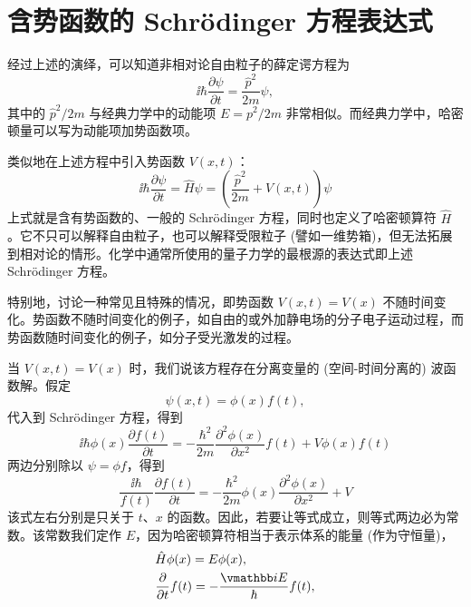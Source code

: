 \section{含势函数的 Schr\"odinger 方程表达式}%

经过上述的演绎，可以知道非相对论自由粒子的薛定谔方程为
\begin{equation}
\ii \hbar \frac{\partial \psi}{\partial t} = \frac{\hat p^2}{2 m} \psi,
\end{equation}
其中的 $\hat p^2 / 2m$ 与经典力学中的动能项 $E = p^2 / 2m$ 非常相似。而经典力学中，哈密顿量可以写为动能项加势函数项。

类似地在上述方程中引入势函数 $V(x, t)$：
\begin{equation}
\ii \hbar \frac{\partial \psi}{\partial t} = \hat H \psi = \left( \frac{\hat p^2}{2 m} + V(x, t) \right) \psi
\end{equation}
上式就是含有势函数的、一般的 Schr\"odinger 方程，同时也定义了哈密顿算符 $\hat H$。它不只可以解释自由粒子，也可以解释受限粒子 (譬如一维势箱)，但无法拓展到相对论的情形。化学中通常所使用的量子力学的最根源的表达式即上述 Schr\"odinger 方程。

特别地，讨论一种常见且特殊的情况，即势函数 $V(x, t) = V(x)$ 不随时间变化。势函数不随时间变化的例子，如自由的或外加静电场的分子电子运动过程，而势函数随时间变化的例子，如分子受光激发的过程。

当 $V(x, t) = V(x)$ 时，我们说该方程存在分离变量的 (空间-时间分离的) 波函数解。假定
\begin{equation}
\psi(x, t) = \phi(x) f(t),
\end{equation}
代入到 Schr\"odinger 方程，得到
\begin{equation}
\ii \hbar \phi(x) \frac{\partial f(t)}{\partial t} = - \frac{\hbar^2}{2 m} \frac{\partial^2 \phi(x)}{\partial x^2} f(t) + V \phi(x) f(t)
\end{equation}
两边分别除以 $\psi = \phi f$，得到
\begin{equation}
\frac{\ii \hbar}{f(t)} \frac{\partial f(t)}{\partial t} = - \frac{\hbar^2}{2 m} \phi(x) \frac{\partial^2 \phi(x)}{\partial x^2} + V 
\end{equation}
该式左右分别是只关于 $t$、$x$ 的函数。因此，若要让等式成立，则等式两边必为常数。该常数我们定作 $E$，因为哈密顿算符相当于表示体系的能量 (作为守恒量)，
\begin{align}
    &\hat H \phi(x) = E \phi(x), \\
    &\pdv{t} f(t) = -\frac{\ii E}\hbar f(t),
\end{align}

